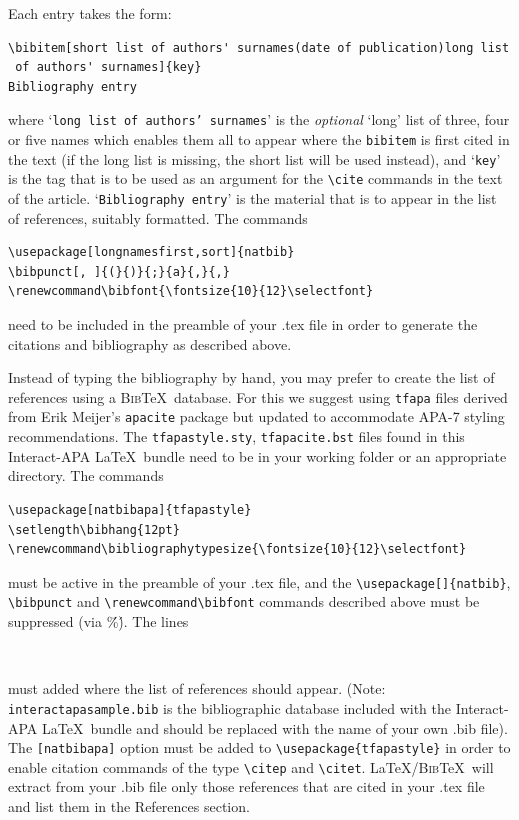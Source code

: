 \documentclass[]{interact}
\renewcommand\bibfont{\fontsize{10}{12}\selectfont}%
\theoremstyle{plain}%
\theoremstyle{definition}
\theoremstyle{remark}
\begin{document}
\bigskip
\noindent Each entry takes the form:
\begin{verbatim}
\bibitem[short list of authors' surnames(date of publication)long list
 of authors' surnames]{key}
Bibliography entry
\end{verbatim}
where `\texttt{long list of authors' surnames}' is the \emph{optional} `long' list of three, four or five names which enables them all to appear where the \verb"bibitem" is first cited in the text (if the long list is missing, the short list will be used instead), and `\texttt{key}' is the tag that is to be used as an argument for the \verb"\cite" commands in the text of the article. `\texttt{Bibliography entry}' is the material that is to appear in the list of references, suitably formatted. The commands

\begin{verbatim}
\usepackage[longnamesfirst,sort]{natbib}
\bibpunct[, ]{(}{)}{;}{a}{,}{,}
\renewcommand\bibfont{\fontsize{10}{12}\selectfont}
\end{verbatim}
need to be included in the preamble of your .tex file in order to generate the citations and bibliography as described above.

Instead of typing the bibliography by hand, you may prefer to create the list of references using a \textsc{Bib}\TeX\ database. For this we suggest using \texttt{tfapa} files derived from Erik Meijer's \texttt{apacite} package but updated to accommodate APA-7 styling recommendations. The \verb"tfapastyle.sty", \verb"tfapacite.bst" files found in this \textsf{Interact}-APA \LaTeX\ bundle need to be in your working folder or an appropriate directory. The commands
\begin{verbatim}
\usepackage[natbibapa]{tfapastyle}
\setlength\bibhang{12pt}
\renewcommand\bibliographytypesize{\fontsize{10}{12}\selectfont}
\end{verbatim}
must be active in the preamble of your .tex file, and the \verb"\usepackage[]{natbib}", \verb"\bibpunct" and \verb"\renewcommand\bibfont" commands described above must be suppressed (via \'\%\'). The lines
\begin{verbatim}


\end{verbatim}
must added where the list of references should appear. (Note: \texttt{interactapasample.bib} is the bibliographic database included with the \textsf{Interact}-APA \LaTeX\ bundle and should be replaced with the name of your own .bib file). The \verb"[natbibapa]" option must be added to \verb"\usepackage{tfapastyle}" in order to enable citation commands of the type \verb"\citep" and \verb"\citet". \LaTeX/\textsc{Bib}\TeX\ will extract from your .bib file only those references that are cited in your .tex file and list them in the References section.
\end{document}

